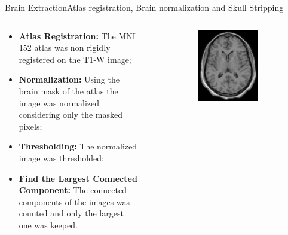 \documentclass[]{standalone}
\begin{document}
	\begin{frame}{Brain Extraction}{Atlas registration, Brain normalization and Skull Stripping}
	
	\vspace{-25pt}
		\begin{columns}
			\begin{column}{0.50\textwidth}
			\small
				\begin{itemize}
				\item \textbf{Atlas Registration:} The MNI 152 atlas was non rigidly registered on the T1-W image;
				\item \textbf{Normalization:} Using the brain mask of the atlas the image was normalized considering only the masked pixels;
				\item \textbf{Thresholding:} The normalized image was thresholded;
				\item \textbf{Find the Largest Connected Component:} The connected components of the images was counted and only the largest one was keeped.
				\end{itemize}
			\end{column}
			\begin{column}{0.55\textwidth}
			\begin{figure}[h!]
			\centering
			\vspace{-6pt}
				\begin{subfigure}{0.45\textwidth}
					\centering
					\includegraphics[scale=0.05]{./IMG/T1.jpg}

\end{subfigure}
\end{figure}
\end{column}
\end{columns}
\end{frame}
\end{document}
